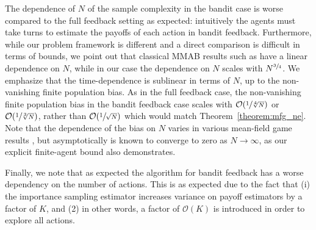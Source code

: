 The dependence of $N$ of the sample complexity in the bandit case is worse compared to the full feedback setting as expected: intuitively the agents must take turns to estimate the payoffs of each action in bandit feedback.
Furthermore, while our problem framework is different and a direct comparison is difficult in terms of bounds, we point out that classical MMAB results such as \citep{lugosi2022multiplayer} have a linear dependence on $N$, while in our case the dependence on $N$ scales with $N^{\sfrac{3}{4}}$.
We emphasize that the time-dependence is sublinear in terms of $N$, up to the non-vanishing finite population bias.
As in the full feedback case, the non-vanishing finite population bias in the bandit feedback case scales with $\mathcal{O}(\sfrac{1}{\sqrt[4]{N}})$ or $\mathcal{O}(\sfrac{1}{\sqrt[3]{N}})$, rather than $\mathcal{O}(\sfrac{1}{\sqrt{N}})$ which would match Theorem~\ref{theorem:mfg_ne}.
Note that the dependence of the bias on $N$ varies in various mean-field game results \citep{saldi2019approximate}, but asymptotically is known to converge to zero as $N\rightarrow\infty$, as our explicit finite-agent bound also demonstrates.

Finally, we note that as expected the algorithm for bandit feedback has a worse dependency on the number of actions.
This is as expected due to the fact that (i) the importance sampling estimator increases variance on payoff estimators by a factor of $K$, and (2) in other words, a factor of $\mathcal{O}(K)$ is introduced in order to explore all actions.
